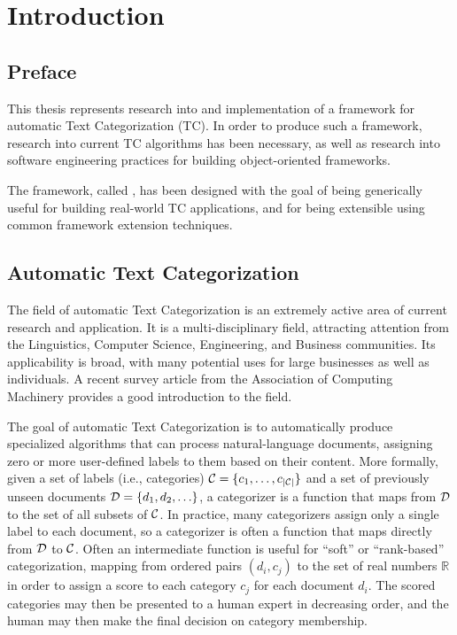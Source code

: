 \chapter{Introduction}

\section{Preface}

This thesis represents research into and implementation of a framework
for automatic Text Categorization (TC).  In order to produce such a
framework, research into current TC algorithms has been necessary, as
well as research into software engineering practices for building
object-oriented frameworks.

The framework, called \aicat, has been designed with the goal of being
generically useful for building real-world TC applications, and for
being extensible using common framework extension techniques.

\section{Automatic Text Categorization}

The field of automatic Text Categorization is an extremely active area
of current research and application.  It is a multi-disciplinary
field, attracting attention from the Linguistics, Computer Science,
Engineering, and Business communities.  Its applicability is broad,
with many potential uses for large businesses as well as individuals.
A recent survey article from the Association of Computing Machinery
provides a good introduction to the field.\cite{sebastiani:02}

The goal of automatic Text Categorization is to automatically produce specialized
algorithms that can process natural-language documents, assigning zero
or more user-defined labels to them based on their content.  More
formally, given a set of labels (i.e., categories) $\mathcal{C} = \{c_1, \ldots, c_{|\mathcal{C}|}\}$ and a set of
previously unseen documents $\mathcal{D} = \{d_1, d_2, \ldots \}$, a categorizer is a
function that maps from $\mathcal{D}$ to the set of all subsets of $\mathcal{C}$.  In
practice, many categorizers assign only a single label to each
document, so a categorizer is often a function that maps directly from
$\mathcal{D}$ to $\mathcal{C}$.  Often an intermediate function is useful for ``soft'' or 
``rank-based'' categorization, mapping from ordered pairs $(d_i, c_j)$ 
to the set of real numbers $\mathbb{R}$ in order to assign a score 
to each category $c_j$ for each document $d_i$.  The scored categories
may then be presented to a human expert in decreasing order, and the
human may then make the final decision on category membership.

